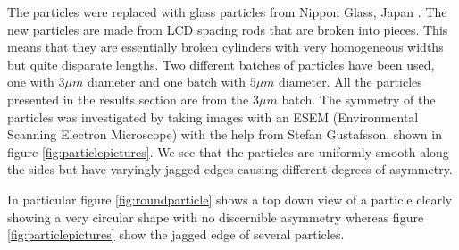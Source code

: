 The particles were replaced with glass particles from Nippon Glass, Japan \cite{Particles}. The new particles are made 
from LCD spacing rods that are broken into pieces. This means that they are essentially broken cylinders with very 
homogeneous widths but quite disparate lengths. Two different batches of particles have been used, one with $3\mu m$ 
diameter and one batch with $5 \mu m$ diameter. All the particles presented in the results section are from the $3 \mu 
m$ batch. 
The symmetry of the particles was investigated by taking images with an 
ESEM (Environmental Scanning Electron Microscope) with the help from Stefan Gustafsson, shown in figure \ref{fig:particlepictures}. We see that the 
particles are uniformly smooth along the sides but have varyingly jagged edges causing different degrees of asymmetry. 

In particular figure \ref{fig:roundparticle} shows a top down view of a particle clearly showing a very circular shape 
with no discernible asymmetry whereas figure \ref{fig:particlepictures} show the jagged edge of several particles. 


